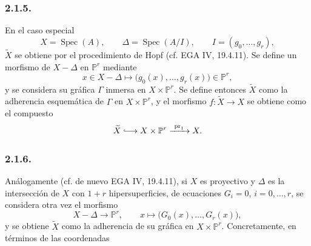 \subsubsection*{2.1.5.}
En el caso especial
\[
X=\operatorname{Spec}(A),\qquad
\Delta=\operatorname{Spec}(A/I),\qquad
I=(g_0,\ldots,g_r),
\]
$\widetilde X$ se obtiene por el procedimiento de Hopf
(cf. EGA IV, 19.4.11). Se define un morfismo de $X-\Delta$ en
$\mathbb P^r$ mediante
\[
x\in X-\Delta\longmapsto
\bigl(g_0(x),\ldots,g_r(x)\bigr)\in\mathbb P^r,
\]
y se considera su gráfica $\Gamma$ inmersa en
$X\times\mathbb P^r$. Se define entonces $\widetilde X$ como la
adherencia esquemática de $\Gamma$ en $X\times\mathbb P^r$, y el
morfismo $f:\widetilde X\longrightarrow X$ se obtiene como el compuesto
\[
\widetilde X\lhook\joinrel\longrightarrow
X\times\mathbb P^r\xrightarrow{\ \operatorname{pr}_1\ }X.
\]

\subsubsection*{2.1.6.}
Análogamente (cf. de nuevo EGA IV, 19.4.11), si $X$ es proyectivo y
$\Delta$ es la intersección de $X$ con $1+r$ hipersuperficies, de
ecuaciones $G_i=0$, $i=0,\ldots,r$, se considera otra vez el morfismo
\[
X-\Delta\longrightarrow\mathbb P^r,\qquad
x\longmapsto\bigl(G_0(x),\ldots,G_r(x)\bigr),
\]
y se obtiene $\widetilde X$ como la adherencia de su gráfica en
$X\times\mathbb P^r$. Concretamente, en términos de las coordenadas

\pageoriginale

